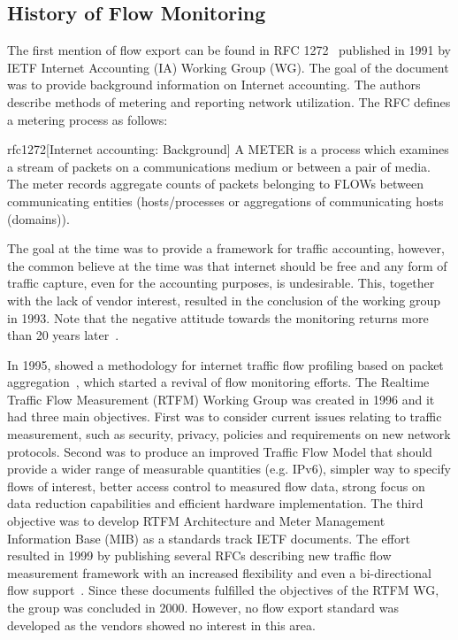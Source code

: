 \subsection{History of Flow Monitoring}\label{subsec:history-of-flow-monitoring}

The first mention of flow export can be found in RFC 1272~\cite{rfc1272} published in 1991 by IETF Internet Accounting (IA) Working Group (WG). The goal of the document was to provide background information on Internet accounting. The authors describe methods of metering and reporting network utilization. The RFC defines a metering process as follows:

\begin{displaycquote}{rfc1272}[Internet accounting: Background]
A METER is a process which examines a stream of packets on a communications medium or between a pair of media. The meter records  aggregate counts of packets belonging to FLOWs between communicating entities (hosts/processes or aggregations of communicating hosts (domains)).
\end{displaycquote}

The goal at the time was to provide a framework for traffic accounting, however, the common believe at the time was that internet should be free and any form of traffic capture, even for the accounting purposes, is undesirable. This, together with the lack of vendor interest, resulted in the conclusion of the working group in 1993. Note that the negative attitude towards the monitoring returns more than 20 years later~\cite{rfc7258}.

In 1995, \citeauthor{Claffy-1995-Parameterizable} showed a methodology for internet traffic flow profiling based on packet aggregation~\cite{Claffy-1995-Parameterizable}, which started a revival of flow monitoring efforts. The Realtime Traffic Flow  Measurement (RTFM) Working Group was created in 1996 and it had three main objectives. First was to consider current issues relating to traffic measurement, such as security, privacy, policies and requirements on new network protocols. Second was to produce an improved Traffic Flow Model that should provide a wider range of measurable quantities (e.g. IPv6), simpler way to specify flows of interest, better access control  to measured flow data, strong focus on data reduction capabilities and efficient hardware implementation. The third objective was to develop RTFM Architecture and Meter Management Information Base (MIB) as a standards track IETF documents. The effort resulted in 1999 by publishing several RFCs describing new traffic flow measurement framework with an increased flexibility and even a bi-directional flow support~\cite{rfc2722}. Since these documents fulfilled the objectives of the RTFM WG, the group was concluded in 2000. However, no flow export standard was developed as the vendors showed no interest in this area.

